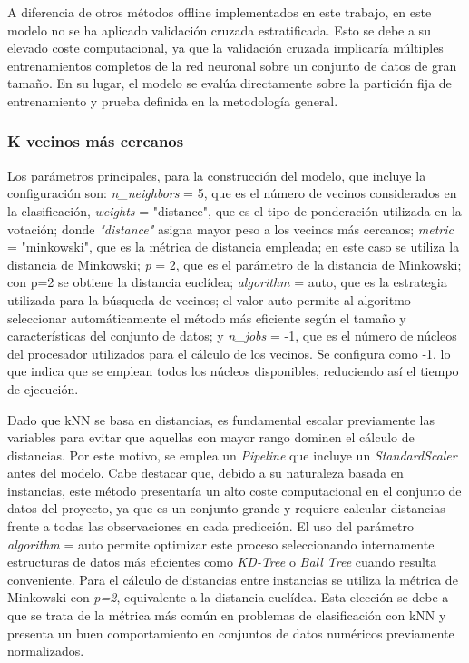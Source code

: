 \documentclass[12pt,a4paper]{report}
\begin{document}
A diferencia de otros métodos offline implementados en este trabajo, en este modelo no se ha aplicado validación cruzada estratificada. Esto se debe a su elevado coste computacional, ya que la validación cruzada implicaría múltiples entrenamientos completos de la red neuronal sobre un conjunto de datos de gran tamaño. En su lugar, el modelo se evalúa directamente sobre la partición fija de entrenamiento y prueba definida en la metodología general.


\subsubsection{K vecinos más cercanos}

Los parámetros principales, para la construcción del modelo, que incluye la configuración son: \emph{n\_neighbors} = 5, que es el número de vecinos considerados en la clasificación, \emph{weights} = "distance", que es el tipo de ponderación utilizada en la votación; donde \emph{"distance"} asigna mayor peso a los vecinos más cercanos; \emph{metric} = "minkowski", que es la métrica de distancia empleada; en este caso se utiliza la distancia de Minkowski; \emph{p} = 2, que es el parámetro de la distancia de Minkowski; con p=2 se obtiene la distancia euclídea; \emph{algorithm} = \textquotedbl{}auto\textquotedbl{}, que es la estrategia utilizada para la búsqueda de vecinos; el valor \textquotedbl{}auto\textquotedbl{} permite al algoritmo seleccionar automáticamente el método más eficiente según el tamaño y características del conjunto de datos; y \emph{n\_jobs} = -1, que es el número de núcleos del procesador utilizados para el cálculo de los vecinos. Se configura como -1, lo que indica que se emplean todos los núcleos disponibles, reduciendo así el tiempo de ejecución.

Dado que kNN se basa en distancias, es fundamental escalar previamente las variables para evitar que aquellas con mayor rango dominen el cálculo de distancias. Por este motivo, se emplea un \emph{Pipeline} que incluye un \emph{StandardScaler} antes del modelo. Cabe destacar que, debido a su naturaleza basada en instancias, este método presentaría un alto coste computacional en el conjunto de datos del proyecto, ya que es un conjunto grande y requiere calcular distancias frente a todas las observaciones en cada predicción. El uso del parámetro \emph{algorithm} = \textquotedbl{}auto\textquotedbl{} permite optimizar este proceso seleccionando internamente estructuras de datos más eficientes como \emph{KD-Tree} o \emph{Ball Tree} cuando resulta conveniente. Para el cálculo de distancias entre instancias se utiliza la métrica de Minkowski con \emph{p=2}, equivalente a la distancia euclídea. Esta elección se debe a que se trata de la métrica más común en problemas de clasificación con kNN y presenta un buen comportamiento en conjuntos de datos numéricos previamente normalizados.
\end{document}
